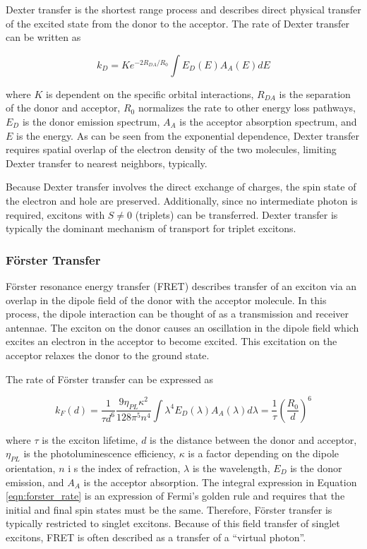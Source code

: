 \documentclass[../thesis.tex]{subfiles}
\begin{document}
Dexter transfer is the shortest range process and describes direct physical transfer of the excited state from the donor to the acceptor.
The rate of Dexter transfer can be written as\supercite{Turro1991a}

\begin{equation}
k_D=Ke^{-2R_{DA}/R_0}\int{ E_D(E)A_A(E)dE}
\label{eqn:dexter_rate}
\end{equation}

where $K$ is dependent on the specific orbital interactions, $R_{DA}$ is the separation of the donor and acceptor, $R_0$ normalizes the rate to other energy loss pathways, $E_D$ is the donor emission spectrum, $A_A$ is the acceptor absorption spectrum, and $E$ is the energy.
As can be seen from the exponential dependence, Dexter transfer requires spatial overlap of the electron density of the two molecules, limiting Dexter transfer to nearest neighbors, typically.

Because Dexter transfer involves the direct exchange of charges, the spin state of the electron and hole are preserved.
Additionally, since no intermediate photon is required, excitons with $S\neq0$ (triplets) can be transferred.
Dexter transfer is typically the dominant mechanism of transport for triplet excitons.

\subsubsection{F\"{o}rster Transfer}

F\"{o}rster resonance energy transfer (FRET) describes transfer of an exciton via an overlap in the dipole field of the donor with the acceptor molecule.
In this process, the dipole interaction can be thought of as a transmission and receiver antennae.  
The exciton on the donor causes an oscillation in the dipole field which excites an electron in the acceptor to become excited.  
This excitation on the acceptor relaxes the donor to the ground state.

The rate of F\"{o}rster transfer can be expressed as\supercite{Menke2013,Mullenbach2013,Menke2016}

\begin{equation}
k_F(d)=\frac{1}{\tau d^6}\frac{9\eta_{PL}\kappa^2}{128\pi^5n^4}\int{\lambda^4E_D(\lambda)A_A(\lambda)d\lambda}=\frac{1}{\tau}\left(\frac{R_0}{d}\right)^6
\label{eqn:forster_rate}
\end{equation}

where $\tau$ is the exciton lifetime, $d$ is the distance between the donor and acceptor, $\eta_{PL}$ is the photoluminescence efficiency, $\kappa$ is a factor depending on the dipole orientation, $n$ i s the index of refraction, $\lambda$ is the wavelength, $E_D$ is the donor emission,  and $A_A$ is the acceptor absorption.
The integral expression in Equation \ref{eqn:forster_rate} is an expression of Fermi's golden rule and requires that the initial and final spin states must be the same.
Therefore, F\"{o}rster transfer is typically restricted to singlet excitons.
Because of this field transfer of singlet excitons, FRET is often described as a transfer of a ``virtual photon''.
\end{document}
